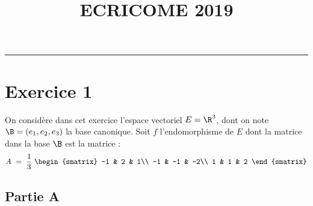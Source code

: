 \documentclass[11pt]{article}%
\title{\bf \vspace{-1.6cm} ECRICOME 2019} %
\author{} %
\date{} %
\begin{document}
\maketitle %
\vspace{-1.2cm}\hrule %
\thispagestyle{fancy}

\vspace*{-.2cm}


\section*{Exercice 1}

\noindent
On considère dans cet exercice l'espace vectoriel $E=\R^3$, dont on
note $\B = (e_1, e_2, e_3)$ la base canonique. Soit $f$ l'endomorphisme de
$E$ dont la matrice dans la base $\B$ est la matrice :
\[
A \ = \ \dfrac{1}{3} \
\begin{smatrix}
  -1 & 2 & 1\\
  -1 & -1 & -2\\
  1 & 1 & 2
\end{smatrix}
\]

\subsection*{Partie A}
\end{document}

